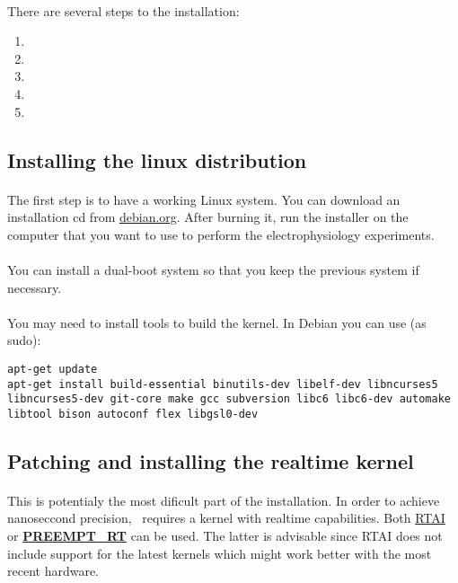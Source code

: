 \paragraph{}
There are several steps to the installation:

\begin{enumerate}
	\item {}
	\item {}
	\item {}
	\item {}
	\item {}
\end{enumerate}

\subsection{Installing the linux distribution} 
\label{install:linux}
\paragraph{}
The first step is to have a working Linux system. 
You can download an installation cd from \href{http://www.debian.org/distrib}{debian.org}. After burning it, run the installer on the computer that you want to use to perform the electrophysiology experiments. 
\paragraph{}
You can install a dual-boot system so that you keep the previous system if necessary.
\paragraph{}
You may need to install tools to build the kernel. In Debian you can use (as sudo):
\begin{lstlisting}
apt-get update
apt-get install build-essential binutils-dev libelf-dev libncurses5 libncurses5-dev git-core make gcc subversion libc6 libc6-dev automake libtool bison autoconf flex libgsl0-dev 
\end{lstlisting}

\subsection{Patching and installing the realtime kernel} 
\label{install:kernel}
\paragraph{}
This is potentialy the most dificult part of the installation. In order to achieve nanoseccond precision, \progname\ requires a kernel with realtime capabilities. Both \href{http://www.rtai.org}{RTAI} or \textbf{\href{https://rt.wiki.kernel.org/index.php/Main\_Page}{PREEMPT\_RT}} can be used. The latter is advisable since RTAI does not include support for the latest kernels which might work better with the most recent hardware.

